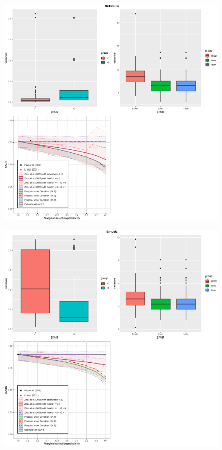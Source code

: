 \documentclass[
]{article}
\begin{document}
\begin{figure}
\begin{center}
\centerline{\includegraphics[width=\textwidth]{var-nishi.eps}}
\end{center}
\end{figure}

\begin{figure}
\begin{center}
\centerline{\includegraphics[width=\textwidth]{var-sch.eps}}
\end{center}
\end{figure}
\end{document}

